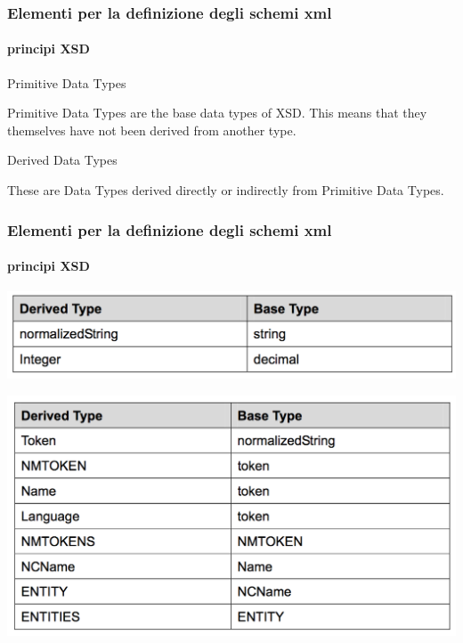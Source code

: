 \begin{frame}
	\frametitle{Elementi per la definizione degli schemi xml}
	\framesubtitle{principi XSD}
	\addtocounter{nframe}{1}

	\begin{block}{Primitive Data Types}


		Primitive Data Types are the base data types of XSD. This means that they themselves have not been derived from another type.


	\end{block}

	\begin{block}{Derived Data Types}

		These are Data Types derived directly or indirectly from Primitive Data Types.

	\end{block}

\end{frame}


\begin{frame}
	\frametitle{Elementi per la definizione degli schemi xml}
	\framesubtitle{principi XSD}
	\addtocounter{nframe}{1}

	\begin{center}
		\includegraphics[width=.95\textwidth]{imgs/DerivedTypeBaseType(2types).png}
	\end{center}

	\begin{center}
		\includegraphics[width=.95\textwidth]{imgs/DerivedTypeFromDerivedType(8types).png}
	\end{center}

\end{frame}

